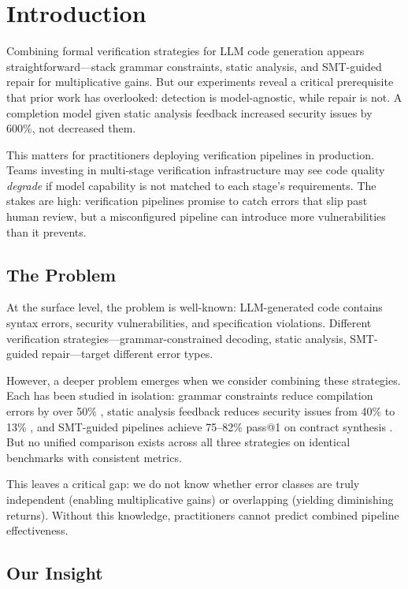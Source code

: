 \section{Introduction}

Combining formal verification strategies for LLM code generation appears straightforward---stack grammar constraints, static analysis, and SMT-guided repair for multiplicative gains. But our experiments reveal a critical prerequisite that prior work has overlooked: detection is model-agnostic, while repair is not. A completion model given static analysis feedback increased security issues by 600\%, not decreased them.

This matters for practitioners deploying verification pipelines in production. Teams investing in multi-stage verification infrastructure may see code quality \emph{degrade} if model capability is not matched to each stage's requirements. The stakes are high: verification pipelines promise to catch errors that slip past human review, but a misconfigured pipeline can introduce more vulnerabilities than it prevents.

\subsection{The Problem}

At the surface level, the problem is well-known: LLM-generated code contains syntax errors, security vulnerabilities, and specification violations. Different verification strategies---grammar-constrained decoding, static analysis, SMT-guided repair---target different error types.

However, a deeper problem emerges when we consider combining these strategies. Each has been studied in isolation: grammar constraints reduce compilation errors by over 50\% \cite{mundler2025type}, static analysis feedback reduces security issues from 40\% to 13\% \cite{blyth2025static}, and SMT-guided pipelines achieve 75--82\% pass@1 on contract synthesis \cite{lim2025contracteval}. But no unified comparison exists across all three strategies on identical benchmarks with consistent metrics.

This leaves a critical gap: we do not know whether error classes are truly independent (enabling multiplicative gains) or overlapping (yielding diminishing returns). Without this knowledge, practitioners cannot predict combined pipeline effectiveness.

\subsection{Our Insight}

